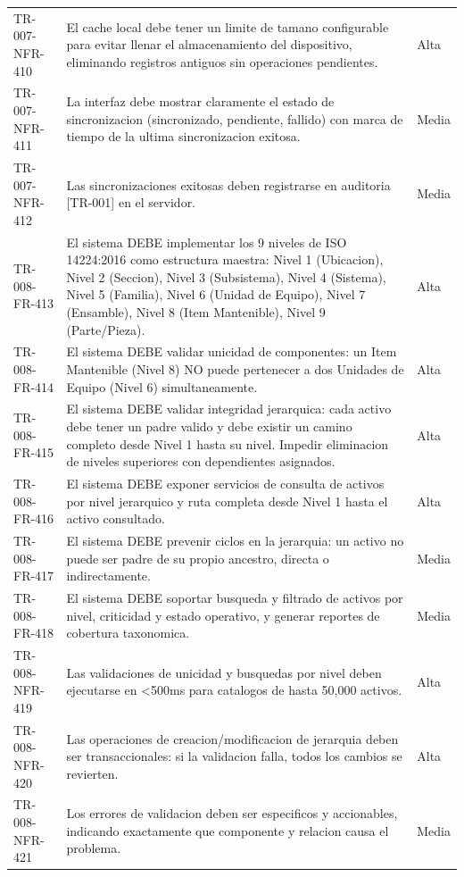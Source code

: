 \begin{longtable}{>{\raggedright\arraybackslash}p{} >{\raggedright\arraybackslash}p{} >{\raggedright\arraybackslash}p{}}
TR-007-NFR-410 & El cache local debe tener un limite de tamano configurable para evitar llenar el almacenamiento del dispositivo, eliminando registros antiguos sin operaciones pendientes. & Alta \\
TR-007-NFR-411 & La interfaz debe mostrar claramente el estado de sincronizacion (sincronizado, pendiente, fallido) con marca de tiempo de la ultima sincronizacion exitosa. & Media \\
TR-007-NFR-412 & Las sincronizaciones exitosas deben registrarse en auditoria [TR-001] en el servidor. & Media \\
TR-008-FR-413 & El sistema DEBE implementar los 9 niveles de ISO 14224:2016 como estructura maestra: Nivel 1 (Ubicacion), Nivel 2 (Seccion), Nivel 3 (Subsistema), Nivel 4 (Sistema), Nivel 5 (Familia), Nivel 6 (Unidad de Equipo), Nivel 7 (Ensamble), Nivel 8 (Item Mantenible), Nivel 9 (Parte/Pieza). & Alta \\
TR-008-FR-414 & El sistema DEBE validar unicidad de componentes: un Item Mantenible (Nivel 8) NO puede pertenecer a dos Unidades de Equipo (Nivel 6) simultaneamente. & Alta \\
TR-008-FR-415 & El sistema DEBE validar integridad jerarquica: cada activo debe tener un padre valido y debe existir un camino completo desde Nivel 1 hasta su nivel. Impedir eliminacion de niveles superiores con dependientes asignados. & Alta \\
TR-008-FR-416 & El sistema DEBE exponer servicios de consulta de activos por nivel jerarquico y ruta completa desde Nivel 1 hasta el activo consultado. & Alta \\
TR-008-FR-417 & El sistema DEBE prevenir ciclos en la jerarquia: un activo no puede ser padre de su propio ancestro, directa o indirectamente. & Media \\
TR-008-FR-418 & El sistema DEBE soportar busqueda y filtrado de activos por nivel, criticidad y estado operativo, y generar reportes de cobertura taxonomica. & Media \\
TR-008-NFR-419 & Las validaciones de unicidad y busquedas por nivel deben ejecutarse en <500ms para catalogos de hasta 50,000 activos. & Alta \\
TR-008-NFR-420 & Las operaciones de creacion/modificacion de jerarquia deben ser transaccionales: si la validacion falla, todos los cambios se revierten. & Alta \\
TR-008-NFR-421 & Los errores de validacion deben ser especificos y accionables, indicando exactamente que componente y relacion causa el problema. & Media \\

\end{longtable}
